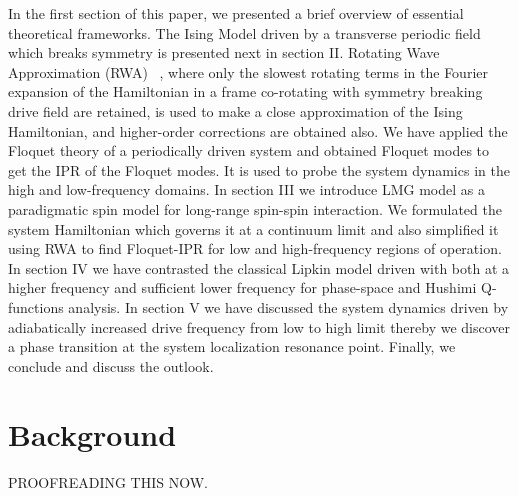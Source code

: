 \documentclass[%
reprint,
superscriptaddress,
amsmath,amssymb,
aps,
prb,
]{revtex4-2}
\begin{document}
	In the first section of this paper, we presented a brief overview of essential theoretical frameworks. The Ising Model driven by a transverse periodic field which breaks symmetry is presented next in section II. Rotating Wave Approximation (RWA) ~\cite{fujii_introduction_2017}, where only the slowest rotating terms in the Fourier expansion of the Hamiltonian in a frame co-rotating with symmetry breaking drive field are retained, is used to make a close approximation of the Ising Hamiltonian, and higher-order corrections are obtained also. We have applied the Floquet theory of a periodically driven system and obtained Floquet modes to get the IPR of the Floquet modes. It is used to probe the system dynamics in the high and low-frequency domains. In section III we introduce  LMG model as a paradigmatic spin model for long-range spin-spin interaction. We formulated the system Hamiltonian which governs it at a continuum limit and also simplified it using RWA to find Floquet-IPR for low and high-frequency regions of operation. In section IV we have contrasted the classical Lipkin model driven with both at a higher frequency and sufficient lower frequency for phase-space and Hushimi Q-functions analysis. In section V we have discussed the  system dynamics driven by adiabatically increased drive frequency from low to high limit thereby we discover a phase transition at the system localization resonance point. Finally, we conclude and discuss the outlook. 
	
	\section{\label{sec:background} Background}
	
	PROOFREADING THIS NOW.
	
\end{document}
